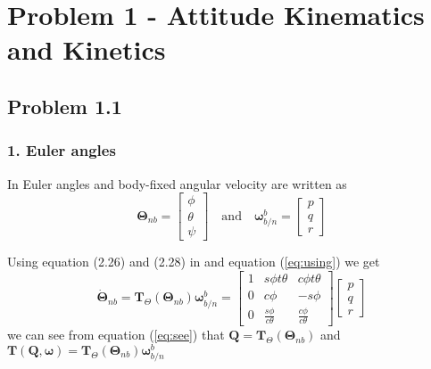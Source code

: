 


\section*{Problem 1 - Attitude Kinematics and Kinetics}

\subsection*{Problem 1.1} 
\subsubsection*{1. Euler angles}
In \cite{Fossen2011} Euler angles and body-fixed angular velocity are written as
\begin{equation}\label{eq:using}
    \mathbf{\Theta}_{nb} = 
    \begin{bmatrix}
    \phi \\ \theta \\ \psi
    \end{bmatrix}
    \quad
    \text{and}
    \quad
    \boldsymbol{\omega}_{b/n}^b =
    \begin{bmatrix}
   p \\ q \\ r
    \end{bmatrix}
\end{equation}

Using equation (2.26) and (2.28) in \cite{Fossen2011} and equation (\ref{eq:using}) we get
\begin{equation}\label{eq:see}
    \dot{\mathbf{\Theta}}_{nb} = \mathbf{T}_\Theta (\mathbf{\Theta}_{nb})\boldsymbol{\omega}_{b/n}^b
     = 
     \begin{bmatrix}
     1 & s\phi t\theta & c\phi t\theta \\
     0 & c\phi & -s\phi \\
     0 & \frac{s\phi}{c\theta} & \frac{c\phi}{c\theta}
     \end{bmatrix}
    \begin{bmatrix}
   p \\ q \\ r
    \end{bmatrix}
\end{equation}
we can see from equation (\ref{eq:see}) that $\mathbf{Q} = \mathbf{T}_\Theta (\mathbf{\Theta}_{nb})$ and $\mathbf{T}(\boldsymbol{Q,\omega}) = \mathbf{T}_\Theta (\mathbf{\Theta}_{nb})\boldsymbol{\omega}_{b/n}^b$







